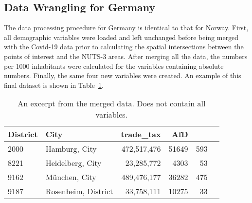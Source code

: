 \subsection*{Data Wrangling for Germany}
The data processing procedure for Germany is identical to that for Norway. First, all demographic variables were loaded and left unchanged before being merged with the Covid-19 data prior to calculating the spatial intersections between the points of interest and the NUTS-3 areas. After merging all the data, the numbers per 1000 inhabitants were calculated for the variables containing absolute numbers. Finally, the same four new variables were created. An example of this final dataset is shown in Table~\ref{finalGermany}.
\begin{table}[H] 
\caption{An excerpt from the merged data. Does not contain all variables.\label{finalGermany}}
\begin{tabular}{l l r r r r}
\toprule
\textbf{District}	& \textbf{City}	& \textbf{trade\_tax}& \textbf{AfD}\\
\midrule
2000 & Hamburg, City & 472,517,476 & 51649 & 593\\
8221 & Heidelberg, City & 23,285,772 & 4303 & 53\\
9162 & München, City &  489,476,177 &  36282 & 475\\
9187 & Rosenheim, District & 33,758,111 & 10275 & 33\\
\bottomrule
\end{tabular}
\end{table}